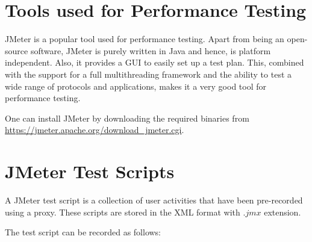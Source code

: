 \documentclass[12pt]{article}
\begin{document}
\section*{Tools used for Performance Testing}
JMeter is a popular tool used for performance testing. Apart from being an open-source software, JMeter is purely written in Java and hence, is platform independent. Also, it provides a GUI to easily set up a test plan. This, combined with the support for a full multithreading framework and the ability to test a wide range of protocols and applications, makes it a very good tool for performance testing.
\par
One can install JMeter by downloading the required binaries from
\\
\url{https://jmeter.apache.org/download_jmeter.cgi}.
\par
\section*{JMeter Test Scripts}
A JMeter test script is a collection of user activities that have been pre-recorded using a proxy. These scripts are stored in the XML format with $.jmx$ extension.
\par
The test script can be recorded as follows:\cite{Performance}
\end{document}
